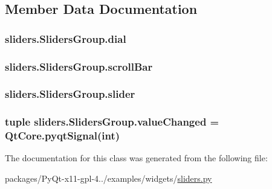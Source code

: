\subsection{Member Data Documentation}
\hypertarget{classsliders_1_1SlidersGroup_a64311b15815e98518d44ff9a251e607d}{}
\subsubsection[{dial}]{\setlength{\rightskip}{0pt plus 5cm}sliders.\+Sliders\+Group.\+dial}\label{classsliders_1_1SlidersGroup_a64311b15815e98518d44ff9a251e607d}
\hypertarget{classsliders_1_1SlidersGroup_af25ba51b8517930c7f01214b0c2b2cbf}{}
\subsubsection[{scroll\+Bar}]{\setlength{\rightskip}{0pt plus 5cm}sliders.\+Sliders\+Group.\+scroll\+Bar}\label{classsliders_1_1SlidersGroup_af25ba51b8517930c7f01214b0c2b2cbf}
\hypertarget{classsliders_1_1SlidersGroup_a596391f24859b01ee0a3911abb3a861e}{}
\subsubsection[{slider}]{\setlength{\rightskip}{0pt plus 5cm}sliders.\+Sliders\+Group.\+slider}\label{classsliders_1_1SlidersGroup_a596391f24859b01ee0a3911abb3a861e}
\hypertarget{classsliders_1_1SlidersGroup_aecfcf3974e3ed597dd1c19ff5d5d7d73}{}
\subsubsection[{value\+Changed}]{\setlength{\rightskip}{0pt plus 5cm}tuple sliders.\+Sliders\+Group.\+value\+Changed = Qt\+Core.\+pyqt\+Signal(int)\hspace{0.3cm}{\ttfamily [static]}}\label{classsliders_1_1SlidersGroup_aecfcf3974e3ed597dd1c19ff5d5d7d73}


The documentation for this class was generated from the following file\+:\begin{DoxyCompactItemize}
\item 
packages/\+Py\+Qt-\/x11-\/gpl-\/4../examples/widgets/\hyperlink{sliders_8py}{sliders.\+py}\end{DoxyCompactItemize}
